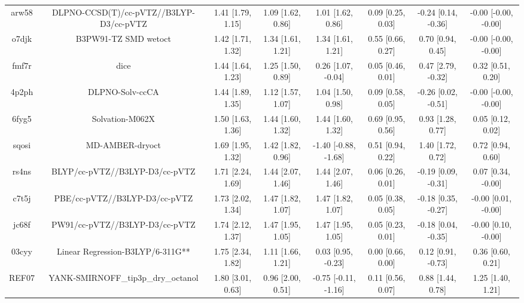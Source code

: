 \documentclass{article}
\begin{document}
\begin{center}
\begin{longtable}{|cccccccc|}
 arw58 &            DLPNO-CCSD(T)/cc-pVTZ//B3LYP-D3/cc-pVTZ &  1.41 [1.79, 1.15] &  1.09 [1.62, 0.86] &     1.01 [1.62, 0.86] &  0.09 [0.25, 0.03] &   -0.24 [0.14, -0.36] &  -0.00 [-0.00, -0.00] \\
 o7djk &                               B3PW91-TZ SMD wetoct &  1.42 [1.71, 1.32] &  1.34 [1.61, 1.21] &     1.34 [1.61, 1.21] &  0.55 [0.66, 0.27] &     0.70 [0.94, 0.45] &  -0.00 [-0.00, -0.00] \\
 fmf7r &                                               dice &  1.44 [1.64, 1.23] &  1.25 [1.50, 0.89] &    0.26 [1.07, -0.04] &  0.05 [0.46, 0.01] &    0.47 [2.79, -0.32] &     0.32 [0.51, 0.20] \\
 4p2ph &                                    DLPNO-Solv-ccCA &  1.44 [1.89, 1.35] &  1.12 [1.57, 1.07] &     1.04 [1.50, 0.98] &  0.09 [0.58, 0.05] &   -0.26 [0.02, -0.51] &  -0.00 [-0.00, -0.00] \\
 6fyg5 &                                    Solvation-M062X &  1.50 [1.63, 1.36] &  1.44 [1.60, 1.32] &     1.44 [1.60, 1.32] &  0.69 [0.95, 0.56] &     0.93 [1.28, 0.77] &     0.05 [0.12, 0.02] \\
 sqosi &                                    MD-AMBER-dryoct &  1.69 [1.95, 1.32] &  1.42 [1.82, 0.96] &  -1.40 [-0.88, -1.68] &  0.51 [0.94, 0.22] &     1.40 [1.72, 0.72] &     0.72 [0.94, 0.60] \\
 rs4ns &                     BLYP/cc-pVTZ//B3LYP-D3/cc-pVTZ &  1.71 [2.24, 1.69] &  1.44 [2.07, 1.46] &     1.44 [2.07, 1.46] &  0.06 [0.26, 0.01] &   -0.19 [0.09, -0.31] &    0.07 [0.34, -0.00] \\
 c7t5j &                      PBE/cc-pVTZ//B3LYP-D3/cc-pVTZ &  1.73 [2.02, 1.34] &  1.47 [1.82, 1.07] &     1.47 [1.82, 1.07] &  0.05 [0.38, 0.05] &   -0.18 [0.35, -0.27] &   -0.00 [0.01, -0.00] \\
 jc68f &                     PW91/cc-pVTZ//B3LYP-D3/cc-pVTZ &  1.74 [2.12, 1.37] &  1.47 [1.95, 1.05] &     1.47 [1.95, 1.05] &  0.05 [0.23, 0.01] &   -0.18 [0.04, -0.35] &   -0.00 [0.10, -0.00] \\
 03cyy &                   Linear Regression-B3LYP/6-311G** &  1.75 [2.34, 1.82] &  1.11 [1.66, 1.21] &    0.03 [0.95, -0.23] &  0.00 [0.66, 0.00] &    0.12 [0.91, -0.73] &     0.36 [0.60, 0.21] \\
 REF07 &                 YANK-SMIRNOFF\_tip3p\_dry\_octanol &  1.80 [3.01, 0.63] &  0.96 [2.00, 0.51] &  -0.75 [-0.11, -1.16] &  0.11 [0.56, 0.07] &     0.88 [1.44, 0.78] &     1.25 [1.40, 1.21] \\

\end{longtable}
\end{center}
\end{document}
